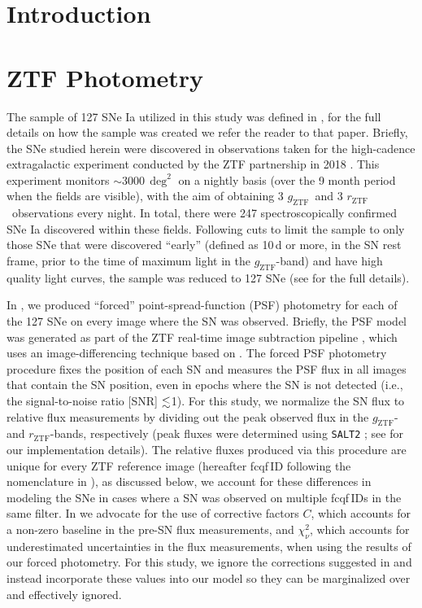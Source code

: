 \documentclass[twocolumn]{./aastex63}
\newcommand{\rztf}{$r_\mathrm{ZTF}$}
\newcommand{\gztf}{$g_\mathrm{ZTF}$}
\begin{document}
\section{Introduction}

\section{ZTF Photometry}

The sample of 127 SNe Ia utilized in this study was defined in \citet{Yao19},
for the full details on how the sample was created we refer the reader to
that paper. Briefly, the SNe studied herein were discovered in observations
taken for the high-cadence extragalactic experiment conducted by the ZTF
partnership in 2018 \citep{Bellm19a}. This experiment monitors
$\sim$3000\,$\deg^2$ on a nightly basis (over the 9 month period when the
fields are visible), with the aim of obtaining 3 \gztf\ and 3 \rztf\
observations every night. In total, there were 247 spectroscopically
confirmed SNe Ia discovered within these fields. Following cuts to limit the
sample to only those SNe that were discovered ``early'' (defined as 10\,d or
more, in the SN rest frame, prior to the time of maximum light in the
\gztf-band) and have high quality light curves, the sample was reduced to 127
SNe (see \citealt{Yao19} for the full details).

In \citet{Yao19}, we produced ``forced'' point-spread-function (PSF)
photometry for each of the 127 SNe on every image where the SN was observed.
Briefly, the PSF model was generated as part of the ZTF real-time image
subtraction pipeline \citep{Masci19}, which uses an image-differencing
technique based on \citet{Zackay16}. The forced PSF photometry procedure
fixes the position of each SN and measures the PSF flux in all images that
contain the SN position, even in epochs where the SN is not detected (i.e.,
the signal-to-noise ratio [SNR] $\lesssim$1). For this study, we normalize the SN
flux to relative flux measurements by dividing out the peak observed flux in
the \gztf- and \rztf-bands, respectively (peak fluxes were determined using
\texttt{SALT2} \citealt{Guglielmo93}; see \citealt{Yao19} for our
implementation details). The relative fluxes produced via this procedure are
unique for every ZTF reference image (hereafter fcqf\,ID following the
nomenclature in \citealt{Yao19}), as discussed below, we account for these
differences in modeling the SNe in cases where a SN was observed on multiple
fcqf\,IDs in the same filter. In \citet{Yao19} we advocate for the use of
corrective factors $C$, which accounts for a non-zero baseline in the pre-SN
flux measurements, and $\chi^2_{\nu}$, which accounts for underestimated
uncertainties in the flux measurements, when using the results of our forced
photometry. For this study, we ignore the corrections suggested in
\citet{Yao19} and instead incorporate these values into our model so they can
be marginalized over and effectively ignored.
\end{document}
